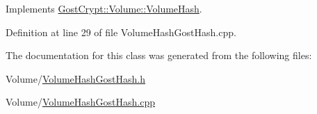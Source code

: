 Implements \hyperlink{class_gost_crypt_1_1_volume_1_1_volume_hash_a58c69a4ea5a247454bd6b4dd6c736ecd}{Gost\+Crypt\+::\+Volume\+::\+Volume\+Hash}.



Definition at line 29 of file Volume\+Hash\+Gost\+Hash.\+cpp.



The documentation for this class was generated from the following files\+:\begin{DoxyCompactItemize}
\item 
Volume/\hyperlink{_volume_hash_gost_hash_8h}{Volume\+Hash\+Gost\+Hash.\+h}\item 
Volume/\hyperlink{_volume_hash_gost_hash_8cpp}{Volume\+Hash\+Gost\+Hash.\+cpp}\end{DoxyCompactItemize}
